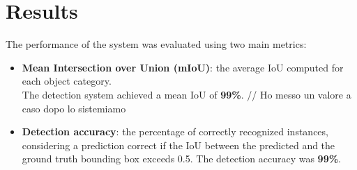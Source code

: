 \documentclass[10.5pt,a4paper]{article}
\begin{document}
\section*{Results}
The performance of the system was evaluated using two main metrics:
\begin{itemize}
    \item \textbf{Mean Intersection over Union (mIoU)}: the average IoU computed for each object category. \\The detection system achieved a mean IoU of \textbf{99\%}.  // Ho messo un valore a caso dopo lo sistemiamo
    \item \textbf{Detection accuracy}: the percentage of correctly recognized instances, considering a prediction correct if the IoU between the predicted and the ground truth bounding box exceeds 0.5. The detection accuracy was \textbf{99\%}.
\end{itemize}
\end{document}
